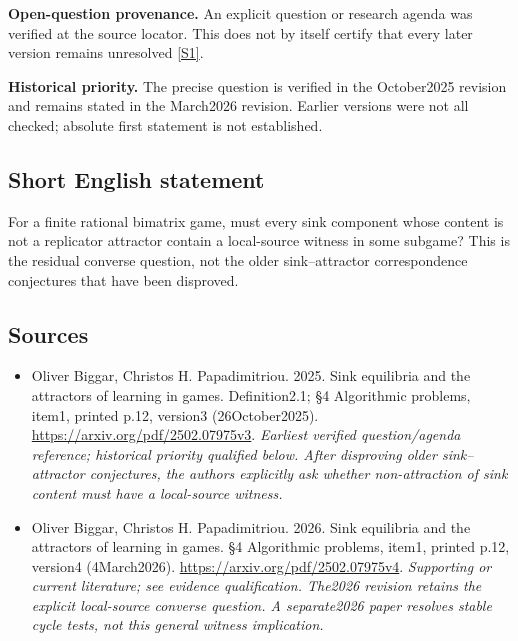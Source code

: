 \documentclass[11pt]{article}
\newcommand{\sref}[2]{\hyperlink{source:#1:#2}{[S#2]}}
\begin{document}
\par\textbf{Open-question provenance.} An explicit question or research agenda was verified at the source locator. This does not by itself certify that every later version remains unresolved \sref{30007566}{1}.

\par\textbf{Historical priority.} The precise question is verified in the October2025 revision and remains stated in the March2026 revision. Earlier versions were not all checked; absolute first statement is not established.

\subsection{Short English statement}
For a finite rational bimatrix game, must every sink component whose content is not a replicator attractor contain a local-source witness in some subgame? This is the residual converse question, not the older sink–attractor correspondence conjectures that have been disproved.

\subsection{Sources}
\begin{itemize}\raggedright
\item[\textnormal{[S1]}]\hypertarget{source:30007566:1}{} Oliver Biggar, Christos H. Papadimitriou. 2025. Sink equilibria and the attractors of learning in games. Definition2.1; §4 Algorithmic problems, item1, printed p.12, version3 (26October2025).
\url{https://arxiv.org/pdf/2502.07975v3}.
{\small\textit{Earliest verified question/agenda reference; historical priority qualified below. After disproving older sink–attractor conjectures, the authors explicitly ask whether non-attraction of sink content must have a local-source witness.}}

\item[\textnormal{[S2]}]\hypertarget{source:30007566:2}{} Oliver Biggar, Christos H. Papadimitriou. 2026. Sink equilibria and the attractors of learning in games. §4 Algorithmic problems, item1, printed p.12, version4 (4March2026).
\url{https://arxiv.org/pdf/2502.07975v4}.
{\small\textit{Supporting or current literature; see evidence qualification. The2026 revision retains the explicit local-source converse question. A separate2026 paper resolves stable cycle tests, not this general witness implication.}}
\end{itemize}
\end{document}
